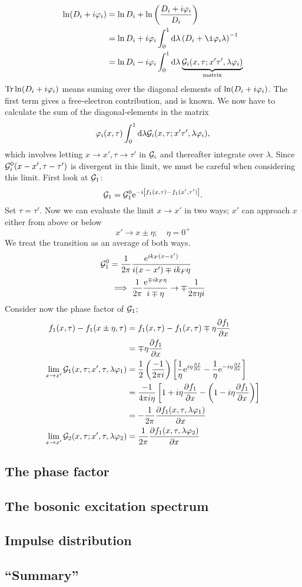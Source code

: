 \begin{align*}
\ln(D_i + i\p_i) &= \ln D_i + \ln\left(\frac{D_i+i\p_i}{D_i}\right) \\
&=\ln D_i +i\p_i\int_0^1\dd\lambda\left(D_i+\i\p_i\lambda\right)^{-1} \\
&=\ln D_i - i\p_i\int_0^1\dd\lambda\underbrace{\gre_i(x,\tau;x'\tau',\lambda\p_i)}_{\text{matrix}}
\end{align*}
$\Tr\ln(D_i+i\varphi_i)$ means suming over the diagonal elements of $\ln(D_i+i\varphi_i)$. The first term gives a free-electron contribution, and is known. 
We now have to calculate the sum of the diagonal-elements in the matrix
\begin{equation}
	\varphi_i(x,\tau)\int_{0}^{1}\dd\lambda\mathcal{G}_i(x,\tau;x'\tau',\lambda\varphi_i),
\end{equation}
which involves letting $x\rightarrow x', \tau\rightarrow\tau'$ in $\mathcal{G}_i$ and thereafter integrate over $\lambda$.
Since $\mathcal{G}_i^0(x-x',\tau-\tau')$ is divergent in this limit, we must be careful when considering this limit. First look at $\mathcal{G}_1$:
\begin{equation}
\mathcal{G}_1 = \mathcal{G}_1^0\mathrm{e}^{-i\left[f_1(x,\tau)-f_1(x',\tau')\right]}.
\end{equation}
Set $\tau =\tau'$. Now we can evaluate the limit $x\rightarrow x'$ in two ways; $x'$ can approach $x$ either from above or below \[x'\rightarrow x\pm\eta;\quad \eta = 0^+\]
We treat the transition as an average of both ways.
\begin{align}
\mathcal{G}_1^0 &= \frac{1}{2\pi}\frac{\mathrm{e}^{ik_F(x-x')}}{i(x-x') \mp ik_F\eta} \\
&\implies \frac{1}{2\pi}\frac{\mathrm{e}^{\mp ik_F\eta}}{i\mp\eta}\rightarrow \mp\frac{1}{2\pi\eta i}
\end{align}
Consider now the phase factor of $\mathcal{G}_1$;
\begin{align*}
f_1(x,\tau) - f_1(x\pm\eta,\tau) &= f_1(x,\tau) - f_1(x,\tau) \mp\eta\pdv{f_1}{x} \\
&= \mp\eta\pdv{f_1}{x} \\
\lim\limits_{x\rightarrow x'}\mathcal{G}_1(x,\tau;x',\tau,\lambda\varphi_1) &= \frac{1}{2}\left(\frac{-1}{2\pi i}\right)\left[\frac{1}{\eta}\mathrm{e}^{i\eta\pdv{f}{x}} - \frac{1}{\eta}\mathrm{e}^{-i\eta\pdv{f}{x}}\right] \\
&= \frac{-1}{4\pi i\eta}\left[1+i\eta\pdv{f_1}{x} - \left(1-i\eta\pdv{f_1}{x}\right)\right] \\
&= -\frac{1}{2\pi}\pdv{f_1(x,\tau,\lambda\varphi_1)}{x} \\
\lim\limits_{x\rightarrow x'}\mathcal{G}_2(x,\tau;x',\tau,\lambda\varphi_2) &= \frac{1}{2\pi}\pdv{f_1(x,\tau,\lambda\varphi_2)}{x}
\end{align*}




\subsection{The phase factor} %
\subsection{The bosonic excitation spectrum} %
\subsection{Impulse distribution} %
\subsection{``Summary''} %
